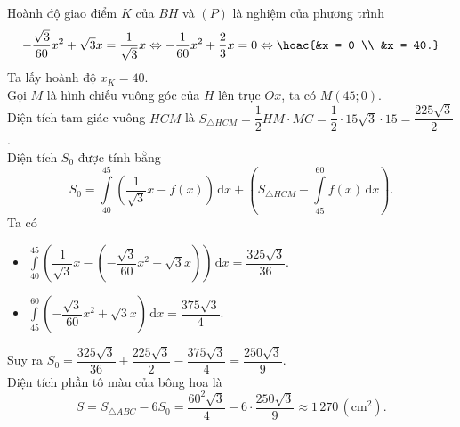 \begin{ex}
{		Hoành độ giao điểm $K$ của $BH$ và $(P)$ là nghiệm của phương trình
		\[
		-\dfrac{\sqrt{3}}{60}x^2 + \sqrt{3}x = \dfrac{1}{\sqrt{3}}x \Leftrightarrow -\dfrac{1}{60}x^2 + \dfrac{2}{3}x = 0 \Leftrightarrow \hoac{&x = 0 \\ &x = 40.}
		\]
		Ta lấy hoành độ $x_K = 40$.\\
		Gọi $M$ là hình chiếu vuông góc của $H$ lên trục $Ox$, ta có $M(45; 0)$.\\
		Diện tích tam giác vuông $HCM$ là $S_{\triangle HCM} = \dfrac{1}{2}HM \cdot MC = \dfrac{1}{2} \cdot 15\sqrt{3} \cdot 15 = \dfrac{225\sqrt{3}}{2}$.\\
		Diện tích $S_0$ được tính bằng
		\[
		S_0 = \displaystyle\int\limits_{40}^{45} \left(\dfrac{1}{\sqrt{3}}x - f(x)\right)\mathrm{\,d}x + \left( S_{\triangle HCM} - \displaystyle\int\limits_{45}^{60} f(x)\mathrm{\,d}x \right).
		\]
		Ta có
		\begin{itemize}
			\item $\displaystyle\int\limits_{40}^{45} \left(\dfrac{1}{\sqrt{3}}x - \left(-\dfrac{\sqrt{3}}{60}x^2 + \sqrt{3}x\right)\right)\mathrm{\,d}x  = \dfrac{325\sqrt{3}}{36}$.
			\item $\displaystyle\int\limits_{45}^{60} \left(-\dfrac{\sqrt{3}}{60}x^2 + \sqrt{3}x\right)\mathrm{\,d}x = \dfrac{375\sqrt{3}}{4}$.
		\end{itemize}
		Suy ra $S_0 = \dfrac{325\sqrt{3}}{36} + \dfrac{225\sqrt{3}}{2} - \dfrac{375\sqrt{3}}{4} = \dfrac{250\sqrt{3}}{9}$.\\
		Diện tích phần tô màu của bông hoa là
		\[
		S = S_{\triangle ABC} - 6S_0 = \dfrac{60^2\sqrt{3}}{4} - 6 \cdot \dfrac{250\sqrt{3}}{9}  \approx 1\,270\,\left(\text{cm}^2\right).
		\]
	}
\end{ex}
